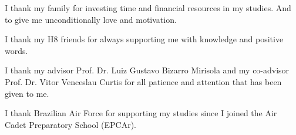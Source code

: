 I thank my family for investing time and financial resources in my studies. And to give me unconditionally love and motivation.

I thank my H8 friends for always supporting me with knowledge and positive words.

I thank my advisor Prof. Dr. Luiz Gustavo Bizarro Mirisola and my co-advisor Prof. Dr. Vitor Venceslau Curtis for all patience and attention that has been given to me.

I thank Brazilian Air Force for supporting my studies since I joined the Air Cadet Preparatory School (EPCAr).
